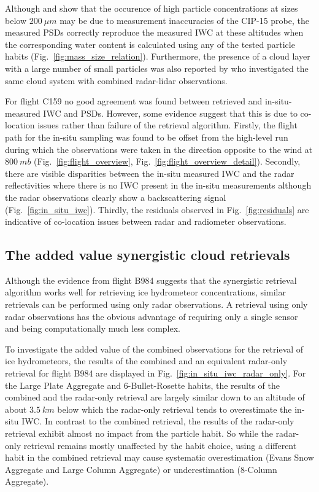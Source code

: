 \documentclass[journal abbreviation, manuscript]{copernicus}
\begin{document}
Although \citet{oshea21} and \citet{oshea19} show that the occurence of high
particle concentrations at sizes below $200\ \unit{\mu m}$ may be due to
measurement inaccuracies of the CIP-15 probe, the measured PSDs correctly
reproduce the measured IWC at these altitudes when the corresponding water
content is calculated using any of the tested particle habits
(Fig.~\ref{fig:mass_size_relation}). Furthermore, the presence of a cloud layer
with a large number of small particles was also reported by \citet{ewald21} who
investigated the same cloud system with combined radar-lidar observations.

For flight C159 no good agreement was found between retrieved and
in-situ-measured IWC and PSDs. However, some evidence suggest that
this is due to co-location issues rather than failure of the retrieval
algorithm. Firstly, the flight path for the in-situ sampling was found to be
offset from the high-level run during which the observations were taken in the
direction opposite to the wind at $800\ \unit{mb}$
(Fig.~\ref{fig:flight_overview}, Fig.~\ref{fig:flight_overview_detail}).
Secondly, there are visible disparities between the in-situ measured IWC and the
radar reflectivities where there is no IWC present in the in-situ measurements
although the radar observations clearly show a backscattering signal
(Fig.~\ref{fig:in_situ_iwc}). Thirdly, the residuals observed in
Fig.~\ref{fig:residuals} are indicative of co-location issues between radar and
radiometer observations.

\subsection{The added value synergistic cloud retrievals}

Although the evidence from flight B984 suggests that the synergistic
retrieval algorithm works well for retrieving ice hydrometeor concentrations,
similar retrievals can be performed using only radar observations. A retrieval
using only radar observations has the obvious advantage of requiring only
a single sensor and being computationally much less complex.

To investigate the added value of the combined observations for the retrieval of
ice hydrometeors, the results of the combined and an equivalent radar-only
retrieval for flight B984 are displayed in
Fig.~\ref{fig:in_situ_iwc_radar_only}. For the Large Plate Aggregate and
6-Bullet-Rosette habits, the results of the combined and the radar-only
retrieval are largely similar down to an altitude of about $3.5\ \unit{km}$
below which the radar-only retrieval tends to overestimate the in-situ IWC. In
contrast to the combined retrieval, the results of the radar-only retrieval
exhibit almost no impact from the particle habit. So while the radar-only
retrieval remains mostly unaffected by the habit choice, using a different
habit in the combined retrieval may cause systematic overestimation (Evans Snow
Aggregate and Large Column Aggregate) or underestimation (8-Column Aggregate).
\end{document}
